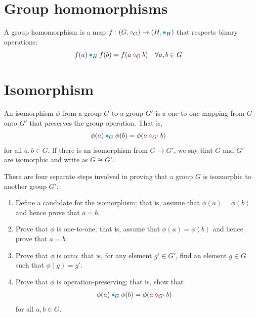 \section{Group homomorphisms}

\begin{definition}
    A group homomorphism is a map $f: (G,{\color{red} \diamond}_G) \to (H, {\color{cyan} \bullet}_H)$ that respects binary operations:
    \begin{equation}
        f(a) \> {\color{cyan} \bullet}_H \> f(b) = f(a \> {\color{red} \diamond}_G \> b) \quad \forall a, b \in G
    \end{equation}
\end{definition}

\section{Isomorphism}
\begin{definition}
    An isomorphism $\phi$ from a group $G$ to a group $G'$ is a one-to-one 
mapping from $G$ onto $G'$ that preserves the group operation. That is, 
\[
    \phi(a) \> {\color{cyan} \bullet}_G \> \phi(b) = \phi(a \> {\color{red} \diamond}_{G'} \> b)
\]
for all $a,b \in G$. If there is an isomorphism from $G \to G'$, we say that $G$ and $G'$ are isomorphic 
and write as $G \cong G'$.
\end{definition}

There are four separate steps involved in proving that a group $G$ is isomorphic to another group $G'$.
\begin{enumerate}
    \item Define a candidate for the isomorphism; that is, assume that $\phi(a) = \phi(b)$ and hence prove that 
        $a=b$.
    \item Prove that $\phi$ is one-to-one; that is, assume that $\phi(a) = \phi(b)$ and hence 
    prove that $a=b$.
    \item  Prove that $\phi$ is onto; that is, for any element $g' \in G'$, find an element $g \in G$
    such that $\phi(g) = g'$.
    \item Prove that $\phi$ is operation-preserving; that is, show that 
    \[
        \phi(a) \> {\color{cyan} \bullet}_G \> \phi(b) = \phi(a \> {\color{red} \diamond}_{G'} \> b)
    \]
    for all $a, b \in G$. 
\end{enumerate}

